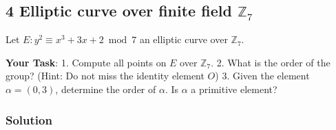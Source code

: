 \documentclass[11pt]{article}
\begin{document}
\newpage

    \hypertarget{elliptic-curve-over-finite-field-mathbbz_7}{%
\subsection{\texorpdfstring{4 Elliptic curve over finite field
\(\mathbb{Z}_7\)}{4 Elliptic curve over finite field \textbackslash{}mathbb\{Z\}\_7}}\label{elliptic-curve-over-finite-field-mathbbz_7}}

Let \(E : y^2 \equiv x^3 +3x+2 \bmod 7\) an elliptic curve over
\(\mathbb{Z}_7\).

\textbf{Your Task}: 1. Compute all points on \(E\) over
\(\mathbb{Z}_7\). 2. What is the order of the group? (Hint: Do not miss
the identity element \(O\)) 3. Given the element \(\alpha = (0,3)\),
determine the order of \(\alpha\). Is \(\alpha\) a primitive element?

\hypertarget{solution}{%
\subsubsection{Solution}\label{solution}}
\end{document}
